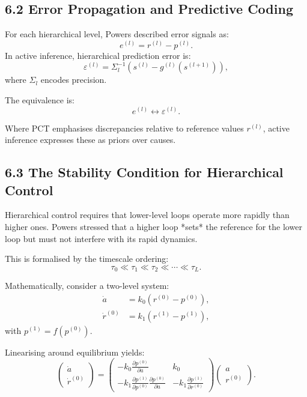 \documentclass[11pt,a4paper,twoside]{article}
\begin{document}
\subsection*{6.2 Error Propagation and Predictive Coding}

For each hierarchical level, Powers described error signals as:
\[
e^{(l)} = r^{(l)} - p^{(l)}.
\]
In active inference, hierarchical prediction error is:
\[
\varepsilon^{(l)} =
\Sigma_l^{-1}\left(s^{(l)} - g^{(l)}(s^{(l+1)})\right),
\]
where $\Sigma_l$ encodes precision.

The equivalence is:
\[
e^{(l)} \leftrightarrow \varepsilon^{(l)}.
\]

Where PCT emphasises discrepancies relative to reference values $r^{(l)}$,
active inference expresses these as priors over causes.

\subsection*{6.3 The Stability Condition for Hierarchical Control}

Hierarchical control requires that lower-level loops operate more rapidly than higher ones.
Powers stressed that a higher loop *sets* the reference for the lower loop but must not interfere with its rapid dynamics.

This is formalised by the timescale ordering:
\[
\tau_0 \ll \tau_1 \ll \tau_2 \ll \cdots \ll \tau_L.
\]

Mathematically, consider a two-level system:
\[
\begin{aligned}
\dot{a} &= k_0 (r^{(0)} - p^{(0)}), \\
\dot{r}^{(0)} &= k_1 (r^{(1)} - p^{(1)}),
\end{aligned}
\]
with $p^{(1)} = f(p^{(0)})$.

Linearising around equilibrium yields:
\[
\begin{pmatrix}
\dot{a} \\
\dot{r}^{(0)}
\end{pmatrix}
=
\begin{pmatrix}
-k_0 \frac{\partial p^{(0)}}{\partial a} & k_0 \\
-k_1 \frac{\partial p^{(1)}}{\partial p^{(0)}}\frac{\partial p^{(0)}}{\partial a} &
 -k_1 \frac{\partial p^{(1)}}{\partial r^{(0)}}
\end{pmatrix}
\begin{pmatrix}
a \\
r^{(0)}
\end{pmatrix}.
\]
\end{document}
